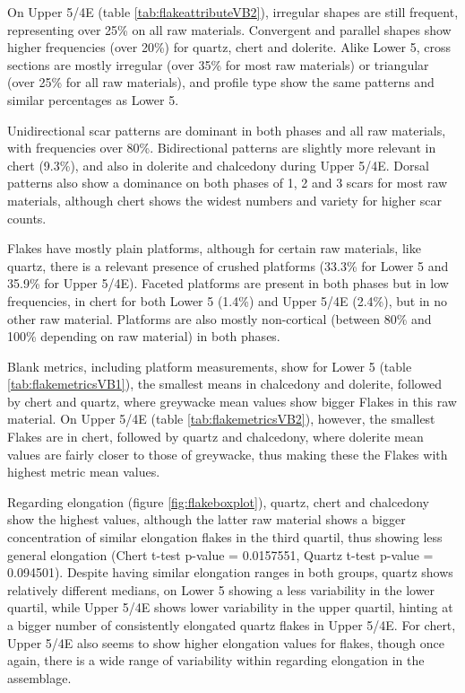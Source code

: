 \documentclass[12pt,twoside]{reedthesis}
\begin{document}
On Upper 5/4E (table \ref{tab:flakeattributeVB2}), irregular shapes are still frequent, representing over 25\% on all raw materials. Convergent and parallel shapes show higher frequencies (over 20\%) for quartz, chert and dolerite. Alike Lower 5, cross sections are mostly irregular (over 35\% for most raw materials) or triangular (over 25\% for all raw materials), and profile type show the same patterns and similar percentages as Lower 5.

Unidirectional scar patterns are dominant in both phases and all raw materials, with frequencies over 80\%. Bidirectional patterns are slightly more relevant in chert (9.3\%), and also in dolerite and chalcedony during Upper 5/4E. Dorsal patterns also show a dominance on both phases of 1, 2 and 3 scars for most raw materials, although chert shows the widest numbers and variety for higher scar counts.

Flakes have mostly plain platforms, although for certain raw materials, like quartz, there is a relevant presence of crushed platforms (33.3\% for Lower 5 and 35.9\% for Upper 5/4E). Faceted platforms are present in both phases but in low frequencies, in chert for both Lower 5 (1.4\%) and Upper 5/4E (2.4\%), but in no other raw material. Platforms are also mostly non-cortical (between 80\% and 100\% depending on raw material) in both phases.

Blank metrics, including platform measurements, show for Lower 5 (table \ref{tab:flakemetricsVB1}), the smallest means in chalcedony and dolerite, followed by chert and quartz, where greywacke mean values show bigger Flakes in this raw material. On Upper 5/4E (table \ref{tab:flakemetricsVB2}), however, the smallest Flakes are in chert, followed by quartz and chalcedony, where dolerite mean values are fairly closer to those of greywacke, thus making these the Flakes with highest metric mean values.

Regarding elongation (figure \ref{fig:flakeboxplot}), quartz, chert and chalcedony show the highest values, although the latter raw material shows a bigger concentration of similar elongation flakes in the third quartil, thus showing less general elongation (Chert t-test p-value = 0.0157551, Quartz t-test p-value = 0.094501). Despite having similar elongation ranges in both groups, quartz shows relatively different medians, on Lower 5 showing a less variability in the lower quartil, while Upper 5/4E shows lower variability in the upper quartil, hinting at a bigger number of consistently elongated quartz flakes in Upper 5/4E. For chert, Upper 5/4E also seems to show higher elongation values for flakes, though once again, there is a wide range of variability within regarding elongation in the assemblage.
\end{document}
